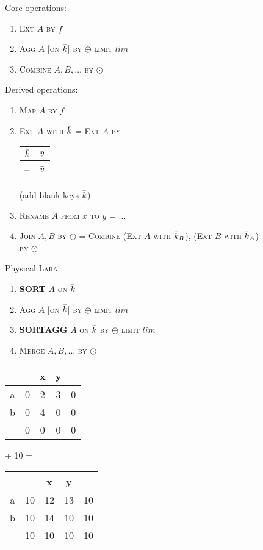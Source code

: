 \documentclass{sig-alternate} %
\newcommand{\lara}{\textsc{Lara}}%
\newcommand{\overbar}[1]{\mkern 1.5mu\overline{\mkern-1.5mu#1\mkern-1.5mu}\mkern 1.5mu}
\newcommand{\tup}[1]{\overbar{#1}}
\newcommand{\bb}[1]{\textsc{#1}}
\newcommand{\bsort}[0]{\textbf{S{\scriptsize ORT}}}
\newcommand{\bext}{\bb{Ext}}
\newcommand{\bmap}{\bb{Map}}
\newcommand{\bby}{\bb{by}}
\newcommand{\bon}{\bb{on}}
\newcommand{\bto}{\bb{to}}
\newcommand{\bfrom}{\bb{from}}
\newcommand{\bjoin}{\bb{Join}}
\newcommand{\bagg}{\bb{Agg}}
\newcommand{\brename}{\bb{Rename}}
\newcommand{\bsortagg}{\textbf{S{\scriptsize ORT}A{\scriptsize GG}}}
\begin{document}
\begin{figure*}[t]
Core operations:
\begin{enumerate}\itemsep0pt
\item \bext{} $A$ \bby{} $f$
\item \bagg{} $A$ [\bon{} $\tup{k}$] \bby{} $\oplus$ \textsc{limit} $lim$
\item \textsc{Combine} $A, B, \dots$ \bby{} $\odot$
\end{enumerate}
Derived operations:
\begin{enumerate}\itemsep0pt
\item \bmap{} $A$ \bby{} $f$
\item \bext{} $A$ \textsc{with} $\tup{k}$ = \bext{} $A$ \bby{} \begin{tabular}{c|c}$\tup{k}$ & $\tup{v}$ \\ \hline -- & $\tup{v}$\end{tabular} (add blank keys $\tup{k}$)
\item \brename{} $A$ \bfrom{} $x$ \bto{} $y$ = $\dots$
\item \bjoin{} $A, B$ \bby{} $\odot$ = \textsc{Combine} (\bext{} $A$ \textsc{with} $\tup{k}_B$), (\bext{} $B$ \textsc{with} $\tup{k}_A$) \bby{} $\odot$
\end{enumerate}
Physical \lara{}:
\begin{enumerate}\itemsep0pt
\item \bsort{} $A$ \bon{} $\tup{k}$
\item \bagg{} $A$ [\bon{} $\tup{k}$] \bby{} $\oplus$ \textsc{limit} $lim$
\item \bsortagg{} $A$ \bon{} $\tup{k}$ \bby{} $\oplus$ \textsc{limit} $lim$
\item \textsc{Merge} $A,B,\dots$ \bby{} $\odot$
\end{enumerate}


\begin{tabular}{c|cccc}
  &   & x & y &   \\
\hline
a & 0 & 2 & 3 & 0 \\
b & 0 & 4 & 0 & 0 \\
  & 0 & 0 & 0 & 0
\end{tabular}
+
10 =
\begin{tabular}{c|cccc}
  &   & x & y &   \\
\hline
a & 10 & 12 & 13 & 10 \\
b & 10 & 14 & 10 & 10 \\
  & 10 & 10 & 10 & 10
\end{tabular}


\end{figure*}
\end{document}
